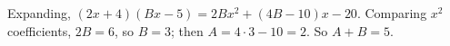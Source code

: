 Expanding, $(2x+4)(Bx-5)=2Bx^2+(4B-10)x-20$. Comparing $x^2$ coefficients, $2B=6$, so $B=3$; then $A=4\cdot3-10=2$. So $A+B=\boxed{5}$.
